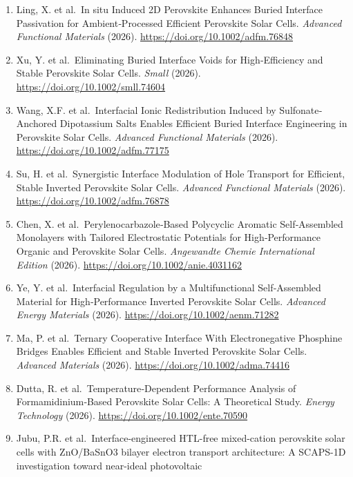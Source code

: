\documentclass[
  11pt,
]{article}
\begin{document}
\begin{enumerate}
  Heterocontact for Efficient and Durable Perovskite Solar Cells via
  Interfacial Reconfiguration. \emph{Angewandte Chemie International
  Edition} (2026). \url{https://doi.org/10.1002/anie.1018855}
\item
  Ling, X. et al.~In situ Induced 2D Perovskite Enhances Buried
  Interface Passivation for Ambient‐Processed Efficient Perovskite Solar
  Cells. \emph{Advanced Functional Materials} (2026).
  \url{https://doi.org/10.1002/adfm.76848}
\item
  Xu, Y. et al.~Eliminating Buried Interface Voids for High‐Efficiency
  and Stable Perovskite Solar Cells. \emph{Small} (2026).
  \url{https://doi.org/10.1002/smll.74604}
\item
  Wang, X.F. et al.~Interfacial Ionic Redistribution Induced by
  Sulfonate‐Anchored Dipotassium Salts Enables Efficient Buried
  Interface Engineering in Perovskite Solar Cells. \emph{Advanced
  Functional Materials} (2026). \url{https://doi.org/10.1002/adfm.77175}
\item
  Su, H. et al.~Synergistic Interface Modulation of Hole Transport for
  Efficient, Stable Inverted Perovskite Solar Cells. \emph{Advanced
  Functional Materials} (2026). \url{https://doi.org/10.1002/adfm.76878}
\item
  Chen, X. et al.~Perylenocarbazole‐Based Polycyclic Aromatic
  Self‐Assembled Monolayers with Tailored Electrostatic Potentials for
  High‐Performance Organic and Perovskite Solar Cells. \emph{Angewandte
  Chemie International Edition} (2026).
  \url{https://doi.org/10.1002/anie.4031162}
\item
  Ye, Y. et al.~Interfacial Regulation by a Multifunctional
  Self‐Assembled Material for High‐Performance Inverted Perovskite Solar
  Cells. \emph{Advanced Energy Materials} (2026).
  \url{https://doi.org/10.1002/aenm.71282}
\item
  Ma, P. et al.~Ternary Cooperative Interface With Electronegative
  Phosphine Bridges Enables Efficient and Stable Inverted Perovskite
  Solar Cells. \emph{Advanced Materials} (2026).
  \url{https://doi.org/10.1002/adma.74416}
\item
  Dutta, R. et al.~Temperature‐Dependent Performance Analysis of
  Formamidinium‐Based Perovskite Solar Cells: A Theoretical Study.
  \emph{Energy Technology} (2026).
  \url{https://doi.org/10.1002/ente.70590}
\item
  Jubu, P.R. et al.~Interface-engineered HTL-free mixed-cation
  perovskite solar cells with ZnO/BaSnO3 bilayer electron transport
  architecture: A SCAPS-1D investigation toward near-ideal photovoltaic

\end{enumerate}
\end{document}
